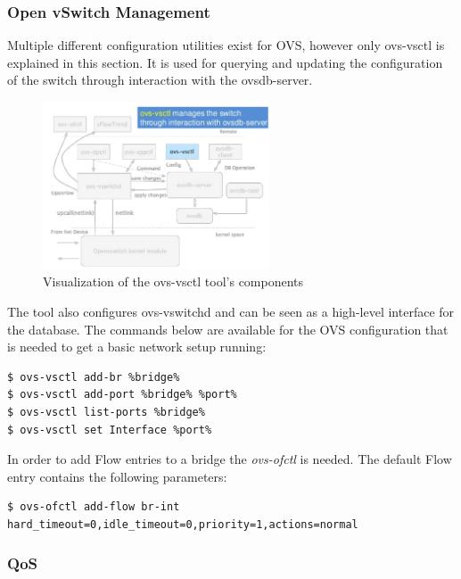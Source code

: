 \subsubsection{Open vSwitch Management}

Multiple different configuration utilities exist for OVS, however only ovs-vsctl is explained in this section. It is used for querying and updating the configuration of the switch through interaction with the ovsdb-server.

\begin{figure}[H]
\centering
\includegraphics[width=0.6\textwidth]{images/fundamentals/openvswitch_vsctl.png}
\caption{Visualization of the ovs-vsctl tool's components}
\end{figure}

The tool also configures ovs-vswitchd and can be seen as a high-level interface for the database.
The commands below are available for the OVS configuration that is needed to get a basic network setup running:

\begin{lstlisting}[language=commands]
$ ovs-vsctl add-br %bridge%
$ ovs-vsctl add-port %bridge% %port%
$ ovs-vsctl list-ports %bridge%
$ ovs-vsctl set Interface %port%
\end{lstlisting}

In order to add Flow entries to a bridge the \textit{ovs-ofctl} is needed. The default Flow entry contains the following parameters:

\begin{lstlisting}[language=commands]
$ ovs-ofctl add-flow br-int hard_timeout=0,idle_timeout=0,priority=1,actions=normal
\end{lstlisting}


\subsubsection{QoS}

